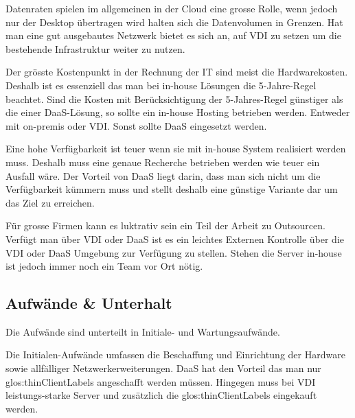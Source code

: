 Datenraten spielen im allgemeinen in der Cloud eine grosse Rolle, wenn jedoch nur der Desktop übertragen wird halten sich die Datenvolumen in Grenzen. Hat man eine gut ausgebautes Netzwerk bietet es sich an, auf VDI zu setzen um die bestehende Infrastruktur weiter zu nutzen.

Der grösste Kostenpunkt in der Rechnung der IT sind meist die Hardwarekosten. Deshalb ist es essenziell das man bei in-house Lösungen die 5-Jahre-Regel beachtet. Sind die Kosten mit Berücksichtigung der 5-Jahres-Regel günstiger als die einer DaaS-Lösung, so sollte ein in-house Hosting betrieben werden. Entweder mit on-premis oder VDI. Sonst sollte DaaS eingesetzt werden.

Eine hohe Verfügbarkeit ist teuer wenn sie mit in-house System realisiert werden muss. Deshalb muss eine genaue Recherche betrieben werden wie teuer ein Ausfall wäre. Der Vorteil von DaaS liegt darin, dass man sich nicht um die Verfügbarkeit kümmern muss und stellt deshalb eine günstige Variante dar um das Ziel zu erreichen.

Für grosse Firmen kann es luktrativ sein ein Teil der Arbeit zu Outsourcen. Verfügt man über VDI oder DaaS ist es ein leichtes Externen Kontrolle über die VDI oder DaaS Umgebung zur Verfügung zu stellen. Stehen die Server in-house ist jedoch immer noch ein Team vor Ort nötig.

\subsection{Aufwände \& Unterhalt}




Die Aufwände sind unterteilt in Initiale- und Wartungsaufwände.

Die Initialen-Aufwände umfassen die Beschaffung und Einrichtung der Hardware sowie allfälliger Netzwerkerweiterungen. DaaS hat den Vorteil das man nur \glspl{glos:thinClientLabel} angeschafft werden müssen. Hingegen muss bei VDI leistungs-starke Server und zusätzlich die \glspl{glos:thinClientLabel} eingekauft werden.

